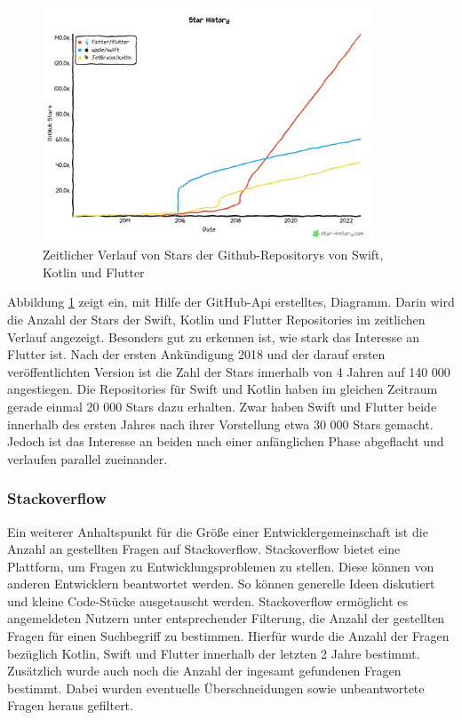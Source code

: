 \begin{figure}[ht]
  \centering
  \includegraphics[height=7cm,keepaspectratio]{images/star-history_programming languages.png} 
  \caption[Zeitlicher Verlauf von Stars der Github-Repositorys von Swift, Kotlin und Flutter]{Zeitlicher Verlauf von Stars der Github-Repositorys von Swift, Kotlin und Flutter\protect\footnotemark }
  \label{fig:star_history}
\end{figure}


Abbildung \ref{fig:star_history} zeigt ein, mit Hilfe der GitHub-Api erstelltes, Diagramm. Darin wird die Anzahl der Stars der Swift, Kotlin und Flutter Repositories im zeitlichen Verlauf angezeigt. 
Besonders gut zu erkennen ist, wie stark das Interesse an Flutter ist. Nach der ersten Ankündigung 2018 und der darauf ersten veröffentlichten Version ist die Zahl der Stars innerhalb von 4 Jahren auf 140 000 angestiegen. Die Repositories für Swift und Kotlin haben im gleichen Zeitraum gerade einmal 20 000 Stars dazu erhalten. Zwar haben Swift und Flutter beide innerhalb des ersten Jahres nach ihrer Vorstellung etwa 30 000 Stars gemacht. Jedoch ist das Interesse an beiden nach einer anfänglichen Phase abgeflacht und verlaufen parallel zueinander.

\subsubsection{Stackoverflow}
Ein weiterer Anhaltspunkt für die Größe einer Entwicklergemeinschaft ist die Anzahl an gestellten Fragen auf Stackoverflow. Stackoverflow bietet eine Plattform, um Fragen zu Entwicklungsproblemen zu stellen. Diese können von anderen Entwicklern beantwortet werden. So können generelle Ideen diskutiert und kleine Code-Stücke ausgetauscht werden. Stackoverflow ermöglicht es angemeldeten Nutzern unter entsprechender Filterung, die Anzahl der gestellten Fragen für einen Suchbegriff zu bestimmen. Hierfür wurde die Anzahl der Fragen bezüglich Kotlin, Swift und Flutter innerhalb der letzten 2 Jahre bestimmt. Zusätzlich wurde auch noch die Anzahl der ingesamt gefundenen Fragen bestimmt. Dabei wurden eventuelle Überschneidungen sowie unbeantwortete Fragen heraus gefiltert.

